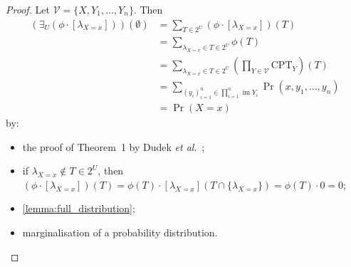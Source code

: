 \documentclass{article}
\DeclareMathOperator{\im}{im}
\newcommand{\etal}{\textit{et al}.}
\begin{document}
\correctness*
\begin{proof}
  Let $\mathcal{V} = \{ X, Y_1, \dots, Y_n \}$. Then
  \begin{align*}
    (\exists_U (\phi \cdot [\lambda_{X=x}]))(\emptyset) &= \sum_{T \in 2^U} (\phi \cdot [\lambda_{X=x}])(T) \\
                                                        &= \sum_{\lambda_{X=x} \in T \in 2^U} \phi(T) \\
                                                        &= \sum_{\lambda_{X=x} \in T \in 2^U} \left( \prod_{Y \in \mathcal{V}} \mathrm{CPT}_Y \right)(T) \\
                                                        &= \sum_{(y_i)_{i=1}^n \in \prod_{i=1}^n \im Y_i} \Pr(x, y_1, \dots, y_n) \\
                                                        &= \Pr(X = x)
  \end{align*}
  by:
  \begin{itemize}
  \item the proof of Theorem~1 by Dudek
    \etal{}~;
  \item if $\lambda_{X=x} \not\in T \in 2^U$, then $(\phi \cdot
    [\lambda_{X=x}])(T) = \phi(T) \cdot [\lambda_{X=x}](T \cap \{
    \lambda_{X=x} \}) = \phi(T) \cdot 0 = 0$;
  \item \cref{lemma:full_distribution};
  \item marginalisation of a probability distribution.
  \end{itemize}
\end{proof}



\end{document}
